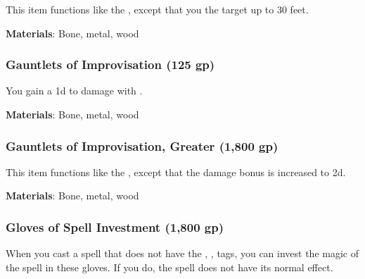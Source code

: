 This item functions like the , except that you  the target up to 30 feet.



\vspace{0.25em}
\textbf{Materials}: Bone, metal, wood


\lowercase{\hypertarget{item:Gauntlets of Improvisation}{}}\label{item:Gauntlets of Improvisation}
\hypertarget{item:Gauntlets of Improvisation}{\subsubsection{Gauntlets of Improvisation\hfill{} (125 gp)}}

You gain a \plus1d  to damage with .



\vspace{0.25em}
\textbf{Materials}: Bone, metal, wood


\lowercase{\hypertarget{item:Gauntlets of Improvisation, Greater}{}}\label{item:Gauntlets of Improvisation, Greater}
\hypertarget{item:Gauntlets of Improvisation, Greater}{\subsubsection{Gauntlets of Improvisation, Greater\hfill{} (1,800 gp)}}

This item functions like the , except that the damage bonus is increased to \plus2d.



\vspace{0.25em}
\textbf{Materials}: Bone, metal, wood


\lowercase{\hypertarget{item:Gloves of Spell Investment}{}}\label{item:Gloves of Spell Investment}
\hypertarget{item:Gloves of Spell Investment}{\subsubsection{Gloves of Spell Investment\hfill{} (1,800 gp)}}

When you cast a spell that does not have the , ,  tags,
you can invest the magic of the spell in these gloves.
If you do, the spell does not have its normal effect.

